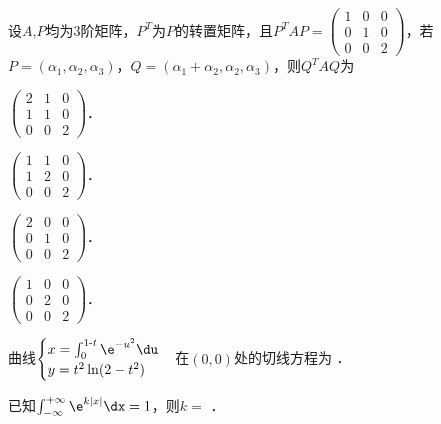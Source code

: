 \documentclass[plain,noanswer,medmath]{../../template/jnuexam}
\begin{document}




\begin{problem}
设$A$,$P$均为$3$阶矩阵，$P^T$为$P$的转置矩阵，且$P^T AP = \begin{pmatrix}
  1 & 0 & 0 \\
  0 & 1 & 0 \\
  0 & 0 & 2
\end{pmatrix}$，若$P = (\alpha_1,\alpha_2,\alpha_3)$，$Q = (\alpha_1 + \alpha_2,\alpha_2,\alpha_3)$，则$Q^T AQ$为\pickout{}
\begin{abcd}
\item $\begin{pmatrix}
  2 & 1 & 0 \\
  1 & 1 & 0 \\
  0 & 0 & 2
\end{pmatrix}$．
\item $\begin{pmatrix}
  1 & 1 & 0 \\
  1 & 2 & 0 \\
  0 & 0 & 2
\end{pmatrix}$．
\item $\begin{pmatrix}
  2 & 0 & 0 \\
  0 & 1 & 0 \\
  0 & 0 & 2
\end{pmatrix}$．
\item $\begin{pmatrix}
  1 & 0 & 0 \\
  0 & 2 & 0 \\
  0 & 0 & 2
\end{pmatrix}$．
\end{abcd}
\end{problem}




\begin{problem}
曲线$\begin{cases}
  x = \int_0^{1\text{-} t} \e^{- u^2} \du \\
  y = t^2\ln(2 - t^2)
\end{cases}$在$(0,0)$处的切线方程为 \fillin{}．
\end{problem}


\begin{problem}
已知$\int_{-\infty}^{+\infty}\e^{k|x|}\dx = 1$，则$k=$ \fillin{}．
\end{problem}
\end{document}
